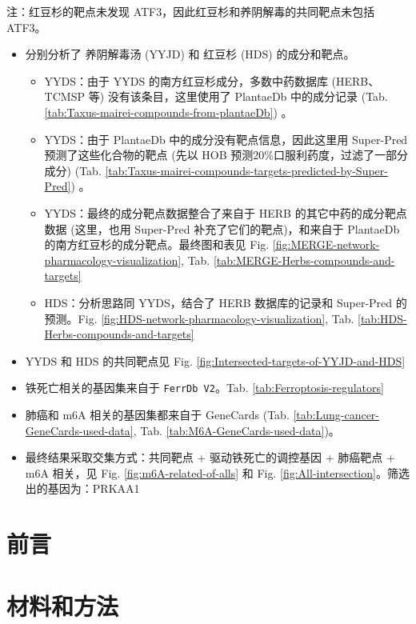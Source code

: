 \documentclass[
]{article}
\providecommand{\tightlist}{%
  \setlength{\itemsep}{0pt}\setlength{\parskip}{0pt}}
\begin{document}
注：红豆杉的靶点未发现 ATF3，因此红豆杉和养阴解毒的共同靶点未包括 ATF3。

\begin{itemize}
\tightlist
\item
  分别分析了 养阴解毒汤 (YYJD) 和 红豆杉 (HDS) 的成分和靶点。

  \begin{itemize}
  \tightlist
  \item
    YYDS：由于 YYDS 的南方红豆杉成分，多数中药数据库 (HERB、TCMSP 等) 没有该条目，这里使用了 PlantaeDb 中的成分记录 (Tab. \ref{tab:Taxus-mairei-compounds-from-plantaeDb}) 。
  \item
    YYDS：由于 PlantaeDb 中的成分没有靶点信息，因此这里用 Super-Pred 预测了这些化合物的靶点 (先以 HOB 预测20\%口服利药度，过滤了一部分成分) (Tab. \ref{tab:Taxus-mairei-compounds-targets-predicted-by-Super-Pred}) 。
  \item
    YYDS：最终的成分靶点数据整合了来自于 HERB 的其它中药的成分靶点数据 (这里，也用 Super-Pred 补充了它们的靶点)，和来自于 PlantaeDb 的南方红豆杉的成分靶点。最终图和表见 Fig. \ref{fig:MERGE-network-pharmacology-visualization}, Tab. \ref{tab:MERGE-Herbs-compounds-and-targets}
  \item
    HDS：分析思路同 YYDS，结合了 HERB 数据库的记录和 Super-Pred 的预测。Fig. \ref{fig:HDS-network-pharmacology-visualization}, Tab. \ref{tab:HDS-Herbs-compounds-and-targets}
  \end{itemize}
\item
  YYDS 和 HDS 的共同靶点见 Fig. \ref{fig:Intersected-targets-of-YYJD-and-HDS}
\item
  铁死亡相关的基因集来自于 \texttt{FerrDb\ V2}。Tab. \ref{tab:Ferroptosis-regulators}
\item
  肺癌和 m6A 相关的基因集都来自于 GeneCards (Tab. \ref{tab:Lung-cancer-GeneCards-used-data}, Tab. \ref{tab:M6A-GeneCards-used-data})。
\item
  最终结果采取交集方式：共同靶点 + 驱动铁死亡的调控基因 + 肺癌靶点 + m6A 相关，见 Fig. \ref{fig:m6A-related-of-alls} 和 Fig. \ref{fig:All-intersection}。筛选出的基因为：PRKAA1
\end{itemize}

\hypertarget{introduction}{%
\section{前言}\label{introduction}}

\hypertarget{methods}{%
\section{材料和方法}\label{methods}}
\end{document}
